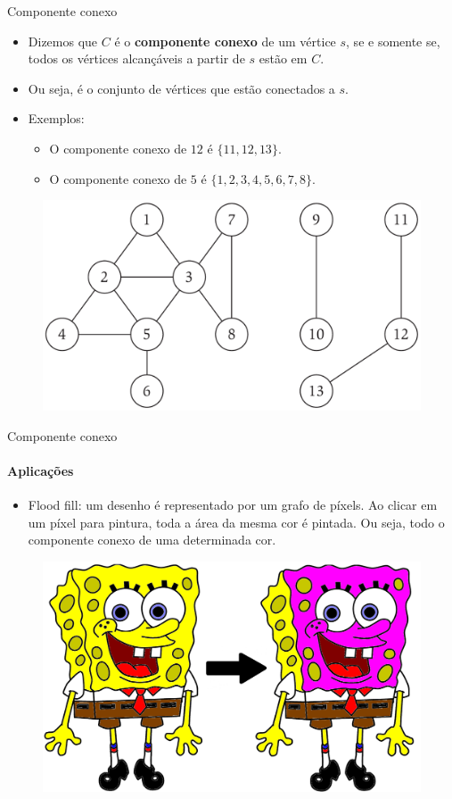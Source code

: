 \begin{frame}{Componente conexo}
	
	\begin{itemize}
		\item Dizemos que $C$ é o \textbf{\color{magenta}componente conexo} de um vértice $s$, se e somente se, todos os vértices alcançáveis a partir de $s$ estão em $C$.
		\item Ou seja, é o conjunto de vértices que estão conectados a $s$.
		\item Exemplos: 
		\begin{itemize}
			\item O componente conexo de $12$ é $\{11, 12, 13\}$.
			\item O componente conexo de $5$ é $\{1, 2, 3, 4, 5, 6, 7, 8\}$.
		\end{itemize}
		
	\end{itemize}

	\begin{figure}
		\centering
		\includegraphics[width=0.55\linewidth]{img/conectividade}
	\end{figure}
\end{frame}



\begin{frame}{Componente conexo}
	\framesubtitle{Aplicações}
	
	\begin{itemize}
		\item {\color{magenta}Flood fill:} um desenho é representado por um grafo de píxels. Ao clicar em um píxel para pintura, toda a área da mesma cor é pintada. Ou seja, todo o componente conexo de uma determinada cor.
	\end{itemize}
	
	\begin{figure}
		\centering
		\includegraphics[width=0.55\linewidth]{img/flood-fill}
	\end{figure}
\end{frame}



